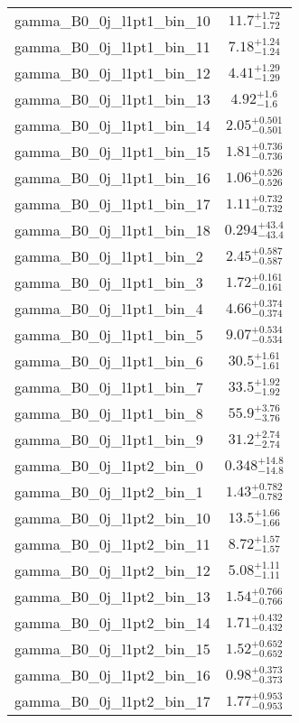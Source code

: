 \begin{tabular}{|l|c|}
gamma\_B0\_0j\_l1pt1\_bin\_10 & $11.7^{+1.72}_{-1.72}$ \\
gamma\_B0\_0j\_l1pt1\_bin\_11 & $7.18^{+1.24}_{-1.24}$ \\
gamma\_B0\_0j\_l1pt1\_bin\_12 & $4.41^{+1.29}_{-1.29}$ \\
gamma\_B0\_0j\_l1pt1\_bin\_13 & $4.92^{+1.6}_{-1.6}$ \\
gamma\_B0\_0j\_l1pt1\_bin\_14 & $2.05^{+0.501}_{-0.501}$ \\
gamma\_B0\_0j\_l1pt1\_bin\_15 & $1.81^{+0.736}_{-0.736}$ \\
gamma\_B0\_0j\_l1pt1\_bin\_16 & $1.06^{+0.526}_{-0.526}$ \\
gamma\_B0\_0j\_l1pt1\_bin\_17 & $1.11^{+0.732}_{-0.732}$ \\
gamma\_B0\_0j\_l1pt1\_bin\_18 & $0.294^{+43.4}_{-43.4}$ \\
gamma\_B0\_0j\_l1pt1\_bin\_2 & $2.45^{+0.587}_{-0.587}$ \\
gamma\_B0\_0j\_l1pt1\_bin\_3 & $1.72^{+0.161}_{-0.161}$ \\
gamma\_B0\_0j\_l1pt1\_bin\_4 & $4.66^{+0.374}_{-0.374}$ \\
gamma\_B0\_0j\_l1pt1\_bin\_5 & $9.07^{+0.534}_{-0.534}$ \\
gamma\_B0\_0j\_l1pt1\_bin\_6 & $30.5^{+1.61}_{-1.61}$ \\
gamma\_B0\_0j\_l1pt1\_bin\_7 & $33.5^{+1.92}_{-1.92}$ \\
gamma\_B0\_0j\_l1pt1\_bin\_8 & $55.9^{+3.76}_{-3.76}$ \\
gamma\_B0\_0j\_l1pt1\_bin\_9 & $31.2^{+2.74}_{-2.74}$ \\
gamma\_B0\_0j\_l1pt2\_bin\_0 & $0.348^{+14.8}_{-14.8}$ \\
gamma\_B0\_0j\_l1pt2\_bin\_1 & $1.43^{+0.782}_{-0.782}$ \\
gamma\_B0\_0j\_l1pt2\_bin\_10 & $13.5^{+1.66}_{-1.66}$ \\
gamma\_B0\_0j\_l1pt2\_bin\_11 & $8.72^{+1.57}_{-1.57}$ \\
gamma\_B0\_0j\_l1pt2\_bin\_12 & $5.08^{+1.11}_{-1.11}$ \\
gamma\_B0\_0j\_l1pt2\_bin\_13 & $1.54^{+0.766}_{-0.766}$ \\
gamma\_B0\_0j\_l1pt2\_bin\_14 & $1.71^{+0.432}_{-0.432}$ \\
gamma\_B0\_0j\_l1pt2\_bin\_15 & $1.52^{+0.652}_{-0.652}$ \\
gamma\_B0\_0j\_l1pt2\_bin\_16 & $0.98^{+0.373}_{-0.373}$ \\
gamma\_B0\_0j\_l1pt2\_bin\_17 & $1.77^{+0.953}_{-0.953}$ \\

\end{tabular}
